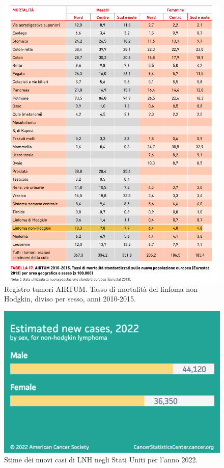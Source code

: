 \begin{figure}[H]
    \begin{center}
    \includegraphics[width=0.8\columnwidth]{img/MORTALITA.png}
    \vspace{-3mm}
    \end{center}
    \caption{Registro tumori AIRTUM. Tasso di mortalità del linfoma non Hodgkin, diviso per sesso, anni 2010-2015.
    \cite{img4-6-7}}

\end{figure}

\begin{figure}[H]
    \begin{center}
    \includegraphics[width=0.5\columnwidth]{img/Estimatednewcases2022.png}
    \vspace{-3mm}
    \end{center}
    \caption{Stime dei nuovi casi di LNH negli Stati Uniti per l’anno 2022.
    \cite{Americanstatistic}}
    \label{fig:FIGURE_2.7}
\end{figure}


